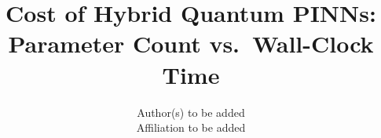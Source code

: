 \documentclass[11pt]{article}
\title{Cost of Hybrid Quantum PINNs: Parameter Count vs.\ Wall-Clock Time}
\author{Author(s) to be added\\ Affiliation to be added}
\date{}
\begin{document}
\maketitle

\begin{abstract}

\end{abstract}











\end{document}
